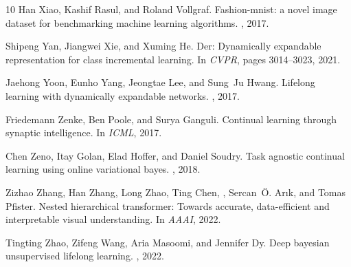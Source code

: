\documentclass[10pt,twocolumn,letterpaper]{article}
\begin{document}
\begin{thebibliography}{10}
Han Xiao, Kashif Rasul, and Roland Vollgraf.
\newblock Fashion-mnist: a novel image dataset for benchmarking machine
  learning algorithms.
, 2017.

Shipeng Yan, Jiangwei Xie, and Xuming He.
\newblock Der: Dynamically expandable representation for class incremental
  learning.
\newblock In {\em CVPR}, pages 3014--3023, 2021.

Jaehong Yoon, Eunho Yang, Jeongtae Lee, and Sung~Ju Hwang.
\newblock Lifelong learning with dynamically expandable networks.
, 2017.

Friedemann Zenke, Ben Poole, and Surya Ganguli.
\newblock Continual learning through synaptic intelligence.
\newblock In {\em ICML}, 2017.

Chen Zeno, Itay Golan, Elad Hoffer, and Daniel Soudry.
\newblock Task agnostic continual learning using online variational bayes.
, 2018.

Zizhao Zhang, Han Zhang, Long Zhao, Ting Chen, , Sercan~Ö. Arık, and Tomas
  Pfister.
\newblock Nested hierarchical transformer: Towards accurate, data-efficient and
  interpretable visual understanding.
\newblock In {\em AAAI}, 2022.

Tingting Zhao, Zifeng Wang, Aria Masoomi, and Jennifer Dy.
\newblock Deep bayesian unsupervised lifelong learning.
, 2022.

\end{thebibliography}
\end{document}
